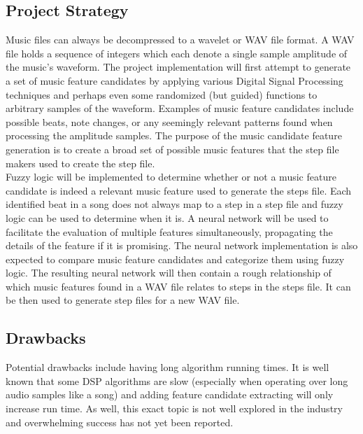 \subsection{Project Strategy}
Music files can always be decompressed to a wavelet or WAV file format. A WAV file holds a sequence of
integers which each denote a single sample amplitude of the music’s waveform. The project
implementation will first attempt to generate a set of music feature candidates by applying 
various Digital Signal Processing techniques and perhaps even some randomized (but guided)
functions to arbitrary samples of the waveform. Examples of music feature candidates include
possible beats, note changes, or any seemingly relevant patterns found when processing the
amplitude samples. The purpose of the music candidate feature generation is to create a broad set
of possible music features that the step file makers used to create the step file.\\

Fuzzy logic will
be implemented to determine whether or not a music feature candidate is indeed a relevant music
feature used to generate the steps file. Each identified beat in a song does not always map to a step in a step file and fuzzy logic can be used to determine when it is. A neural network will be used to facilitate the evaluation
of multiple features simultaneously, propagating the details of the feature if it is promising. The
neural network implementation is also expected to compare music feature candidates and
categorize them using fuzzy logic. The resulting neural network will then contain a rough
relationship of which music features found in a WAV file relates to steps in the steps file. It can
be then used to generate step files for a new WAV file.

\subsection{Drawbacks}

Potential drawbacks include having long algorithm running times. It is well known that some
DSP algorithms are slow (especially when operating over long audio samples like a song) and
adding feature candidate extracting will only increase run time. As well, this exact topic is not
well explored in the industry and overwhelming success has not yet been reported.